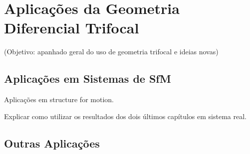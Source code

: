 \section{Aplicações da Geometria Diferencial Trifocal}\label{sec:apli:geo:dif:tri}
(Objetivo: apanhado geral do uso de geometria trifocal e ideias novas)

\subsection{Aplicações em Sistemas de SfM}
Aplicações em structure for motion.

Explicar como utilizar os resultados dos dois últimos capítulos em sistema real.

\subsection{Outras Aplicações}
